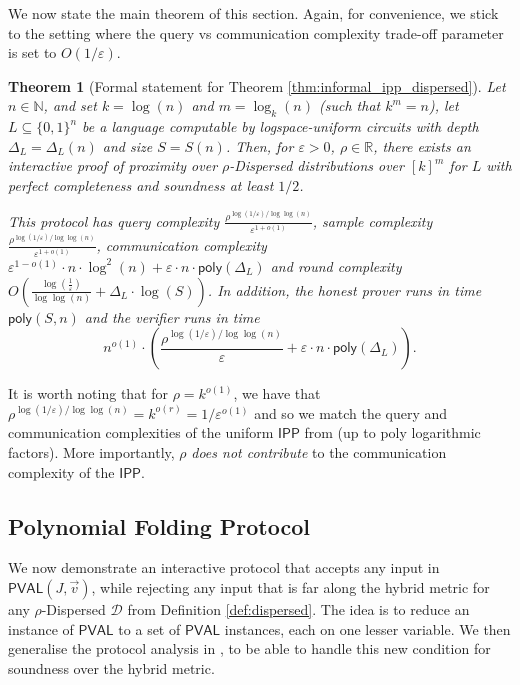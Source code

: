 \documentclass[10pt,a4paper]{article}
\newtheorem{theorem}{Theorem}[section]
\newcommand{\poly}{\mathsf{poly}}
\newcommand{\PVAL}{\mathsf{PVAL}}
\newcommand{\IPP}{\mathsf{IPP}}
\newcommand{\N}{\mathbb{N}}
\newcommand{\sD}{\mathcal{D}}
\newcommand{\eps}{\varepsilon}
\begin{document}
\noindent We now state the main theorem of this section. Again, for convenience, we stick to the setting where the query vs communication complexity trade-off parameter is set to $O(1/\eps)$. 
\begin{theorem}[Formal statement for Theorem \ref{thm:informal_ipp_dispersed}]
\label{thm:dispersed_ipp_nc}
Let $n\in \N$, and set $k=\log (n)$ and $m=\log_{k}(n)$ (such that $k^m=n$), let $L \subseteq \{0,1\}^{n}$ be a language computable by logspace-uniform  circuits with depth $\Delta_{L}=\Delta_{L}(n)$ and size $S=S(n)$. Then, for $\varepsilon > 0$, $\rho\in \mathbb{R}$, there exists an interactive proof of proximity over $\rho$-Dispersed distributions over $[k]^{m}$ for $L$ with perfect completeness and soundness at least $1/2$.

This protocol has query complexity $\frac{\rho^{\log (1/\varepsilon)/\log\log (n)}}{\varepsilon ^{1+o(1)}}$, sample complexity $\frac{\rho^{\log (1/\varepsilon)/\log\log (n)}}{\varepsilon ^{1+o(1)}}$, communication complexity $
\varepsilon^{1-o(1)}\cdot  n\cdot \log^{2}(n)+\varepsilon\cdot n\cdot \poly(\Delta_{L})$ and round complexity $O\left(\frac{\log\left(\frac{1}{\varepsilon}\right)}{\log\log (n)}+\Delta_{L}\cdot\log (S)\right)$. In addition, the honest prover runs in time $\poly(S,n)$ and the verifier runs in time
\[n^{o(1)} \cdot \left( \frac{\rho^{\log (1/\varepsilon)/\log\log (n)}}{\varepsilon}+\varepsilon\cdot n\cdot\poly(\Delta_{L}) \right).
\]
\end{theorem}

It is worth noting that for $\rho=k^{o(1)}$, we have that $\rho^{\log (1/\varepsilon)/\log\log (n)}=k^{o(r)}=1/\varepsilon^{o(1)}$ and so we match the query and communication complexities of the uniform $\IPP$ from \cite{RVW} (up to poly logarithmic factors). More importantly, $\rho$ \textit{does not contribute} to the communication complexity of the $\IPP$.



\subsection{Polynomial Folding Protocol}\label{POLYFOLD}
We now demonstrate an interactive protocol that accepts any input in $\PVAL(J,\Vec{v})$, while rejecting any input that is far along the hybrid metric for any $\rho$-Dispersed $\sD$ from Definition \ref{def:dispersed}. The idea is to reduce an instance of $\PVAL$ to a set of $\PVAL$ instances, each on one lesser variable. We then generalise the protocol analysis in \cite{RVW}, to be able to handle this new condition for soundness over the hybrid metric. 
\end{document}
